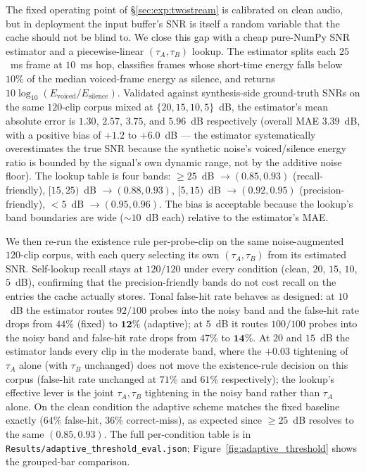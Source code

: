 \documentclass[a4paper,fleqn]{cas-dc}
\begin{document}
The fixed operating point of \S\ref{sec:exp:twostream} is calibrated on clean audio, but in deployment the input buffer's SNR is itself a random variable that the cache should not be blind to. We close this gap with a cheap pure-NumPy SNR estimator and a piecewise-linear $(\tau_A, \tau_B)$ lookup. The estimator splits each $25$~ms frame at $10$~ms hop, classifies frames whose short-time energy falls below $10\%$ of the median voiced-frame energy as silence, and returns $10\log_{10}(E_{\text{voiced}}/E_{\text{silence}})$. Validated against synthesis-side ground-truth SNRs on the same $120$-clip corpus mixed at $\{20, 15, 10, 5\}$~dB, the estimator's mean absolute error is $1.30$, $2.57$, $3.75$, and $5.96$~dB respectively (overall MAE $3.39$~dB, with a positive bias of $+1.2$ to $+6.0$~dB --- the estimator systematically overestimates the true SNR because the synthetic noise's voiced/silence energy ratio is bounded by the signal's own dynamic range, not by the additive noise floor). The lookup table is four bands: $\geq 25$~dB $\to (0.85, 0.93)$ (recall-friendly), $[15, 25)$~dB $\to (0.88, 0.93)$, $[5, 15)$~dB $\to (0.92, 0.95)$ (precision-friendly), $<5$~dB $\to (0.95, 0.96)$. The bias is acceptable because the lookup's band boundaries are wide ($\sim 10$~dB each) relative to the estimator's MAE.

We then re-run the existence rule per-probe-clip on the same noise-augmented $120$-clip corpus, with each query selecting its own $(\tau_A, \tau_B)$ from its estimated SNR. Self-lookup recall stays at $120/120$ under every condition (clean, $20$, $15$, $10$, $5$~dB), confirming that the precision-friendly bands do not cost recall on the entries the cache actually stores. Tonal false-hit rate behaves as designed: at $10$~dB the estimator routes $92/100$ probes into the noisy band and the false-hit rate drops from $44\%$ (fixed) to $\mathbf{12\%}$ (adaptive); at $5$~dB it routes $100/100$ probes into the noisy band and false-hit rate drops from $47\%$ to $\mathbf{14\%}$. At $20$ and $15$~dB the estimator lands every clip in the moderate band, where the $+0.03$ tightening of $\tau_A$ alone (with $\tau_B$ unchanged) does not move the existence-rule decision on this corpus (false-hit rate unchanged at $71\%$ and $61\%$ respectively); the lookup's effective lever is the joint $\tau_A, \tau_B$ tightening in the noisy band rather than $\tau_A$ alone. On the clean condition the adaptive scheme matches the fixed baseline exactly ($64\%$ false-hit, $36\%$ correct-miss), as expected since $\geq 25$~dB resolves to the same $(0.85, 0.93)$. The full per-condition table is in \texttt{Results/adaptive\_threshold\_eval.json}; Figure~\ref{fig:adaptive_threshold} shows the grouped-bar comparison.
\end{document}
